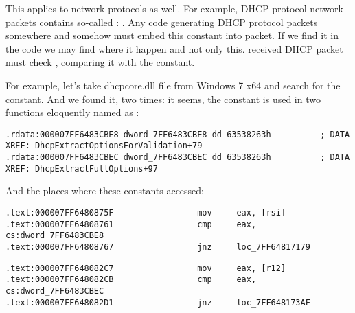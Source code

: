 {This applies to network protocols as well.
For example, DHCP protocol network packets contains so-called : .
Any code generating DHCP protocol packets somewhere and somehow must embed this constant into packet.
If we find it in the code we may find where it happen and not only this.
 received DHCP packet must check , comparing it with the constant.}

{For example, let's take dhcpcore.dll file from Windows 7 x64 and search for the constant.
And we found it, two times:
it seems, the constant is used in two functions eloquently 
named as}  \AndENRU {}:

\begin{lstlisting}[caption=dhcpcore.dll (Windows 7 x64)]
.rdata:000007FF6483CBE8 dword_7FF6483CBE8 dd 63538263h          ; DATA XREF: DhcpExtractOptionsForValidation+79
.rdata:000007FF6483CBEC dword_7FF6483CBEC dd 63538263h          ; DATA XREF: DhcpExtractFullOptions+97
\end{lstlisting}

{And the places where these constants accessed:}

\begin{lstlisting}[caption=dhcpcore.dll (Windows 7 x64)]
.text:000007FF6480875F                 mov     eax, [rsi]
.text:000007FF64808761                 cmp     eax, cs:dword_7FF6483CBE8
.text:000007FF64808767                 jnz     loc_7FF64817179
\end{lstlisting}


\begin{lstlisting}[caption=dhcpcore.dll (Windows 7 x64)]
.text:000007FF648082C7                 mov     eax, [r12]
.text:000007FF648082CB                 cmp     eax, cs:dword_7FF6483CBEC
.text:000007FF648082D1                 jnz     loc_7FF648173AF
\end{lstlisting}

